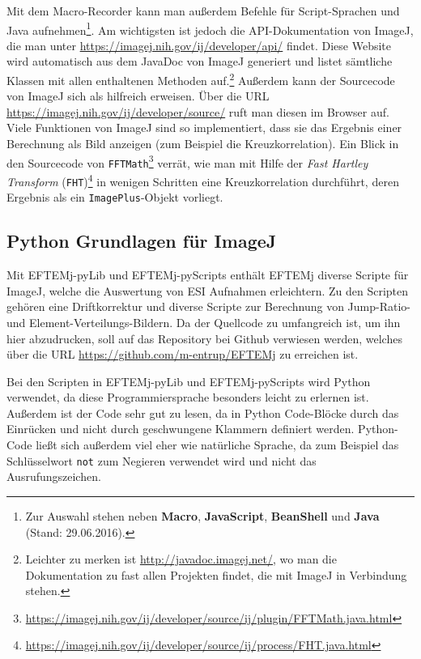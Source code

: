 \documentclass[
	paper=a4,				%
	twoside=true,			%
	BCOR=6mm,				%
	fontsize=12pt,			%
	pagesize=auto,			%
	numbers=noenddot,		%
	bibliography=totoc,		%
	draft=false
]{scrartcl}
\begin{document}
Mit dem Macro-Recorder kann man außerdem Befehle für Script-Sprachen und Java aufnehmen\footnote{Zur Auswahl stehen neben \textbf{Macro}, \textbf{JavaScript}, \textbf{BeanShell} und \textbf{Java} (Stand: 29.06.2016).}. Am wichtigsten ist jedoch die API-Dokumentation von ImageJ, die man unter \url{https://imagej.nih.gov/ij/developer/api/} findet. Diese Website wird automatisch aus dem JavaDoc von ImageJ generiert und listet sämtliche Klassen mit allen enthaltenen Methoden auf.\footnote{Leichter zu merken ist \url{http://javadoc.imagej.net/}, wo man die Dokumentation zu fast allen Projekten findet, die mit ImageJ in Verbindung stehen.} Außerdem kann der Sourcecode von ImageJ sich als hilfreich erweisen. Über die URL \url{https://imagej.nih.gov/ij/developer/source/} ruft man diesen im Browser auf. Viele Funktionen von ImageJ sind so implementiert, dass sie das Ergebnis einer Berechnung als Bild anzeigen (zum Beispiel die Kreuzkorrelation). Ein Blick in den Sourcecode von \texttt{FFTMath}\footnote{\url{https://imagej.nih.gov/ij/developer/source/ij/plugin/FFTMath.java.html}} verrät, wie man mit Hilfe der \textit{Fast Hartley Transform} (\texttt{FHT})\footnote{\url{https://imagej.nih.gov/ij/developer/source/ij/process/FHT.java.html}} in wenigen Schritten eine Kreuzkorrelation durchführt, deren Ergebnis als ein \texttt{ImagePlus}-Objekt vorliegt.

\subsection*{Python Grundlagen für ImageJ}\label{append:ImageJ-Python}

Mit EFTEMj-pyLib und EFTEMj-pyScripts enthält EFTEMj diverse Scripte für ImageJ, welche die Auswertung von ESI Aufnahmen erleichtern. Zu den Scripten gehören eine Driftkorrektur und diverse Scripte zur Berechnung von Jump-Ratio- und Element-Verteilungs-Bildern. Da der Quellcode zu umfangreich ist, um ihn hier abzudrucken, soll auf das Repository bei Github verwiesen werden, welches über die URL \url{https://github.com/m-entrup/EFTEMj} zu erreichen ist.

Bei den Scripten in EFTEMj-pyLib und EFTEMj-pyScripts wird Python verwendet, da diese Programmiersprache besonders leicht zu erlernen ist. Außerdem ist der Code sehr gut zu lesen, da in Python Code-Blöcke durch das Einrücken und nicht durch geschwungene Klammern definiert werden. Python-Code ließt sich außerdem viel eher wie natürliche Sprache, da zum Beispiel das Schlüsselwort \texttt{not} zum Negieren verwendet wird und nicht das Ausrufungszeichen.
\end{document}
